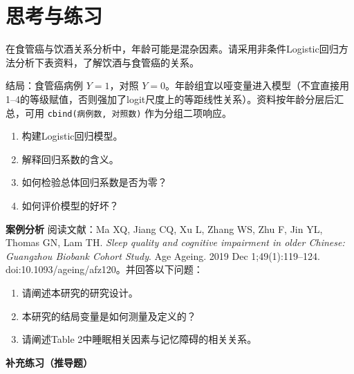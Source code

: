 \section{思考与练习}
在食管癌与饮酒关系分析中，年龄可能是混杂因素。请采用非条件Logistic回归方法分析下表资料，了解饮酒与食管癌的关系。
\begin{annotation}结局：食管癌病例 $Y=1$，对照 $Y=0$。年龄组宜以哑变量进入模型（不宜直接用1--4的等级赋值，否则强加了logit尺度上的等距线性关系）。资料按年龄分层后汇总，可用 \texttt{cbind(病例数, 对照数)} 作为分组二项响应。\end{annotation}
\begin{enumerate}
\item 构建Logistic回归模型。
\item 解释回归系数的含义。
\item 如何检验总体回归系数是否为零？
\item 如何评价模型的好坏？
\end{enumerate}
\textbf{案例分析} 阅读文献：Ma XQ, Jiang CQ, Xu L, Zhang WS, Zhu F, Jin YL, Thomas GN, Lam TH. \textit{Sleep quality and cognitive impairment in older Chinese: Guangzhou Biobank Cohort Study}. Age Ageing. 2019 Dec 1;49(1):119--124. doi:10.1093/ageing/afz120。并回答以下问题：
\begin{enumerate}
\item 请阐述本研究的研究设计。
\item 本研究的结局变量是如何测量及定义的？
\item 请阐述Table 2中睡眠相关因素与记忆障碍的相关关系。
\end{enumerate}
\par{}\noindent\textbf{补充练习（推导题）}
